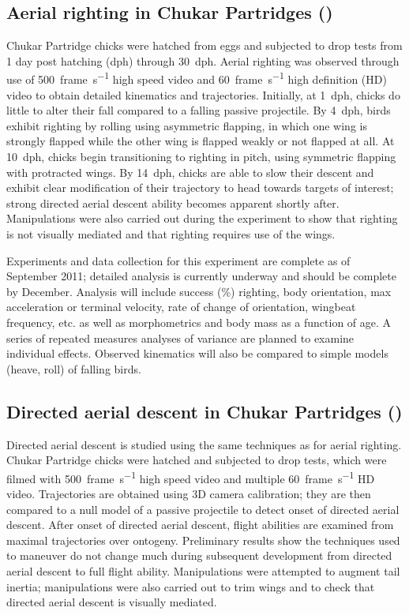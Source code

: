 \subsection{Aerial righting in Chukar Partridges (\Alectorischukar)}
Chukar Partridge chicks were hatched from eggs and subjected to drop tests from 1 day post hatching (dph) through \SI{30}{dph}.  Aerial righting was observed through use of \SI{500}{frame\per\second} high speed video and \SI{60}{frame\per\second} high definition (HD) video to obtain detailed kinematics and trajectories.  Initially, at \SI{1}{dph}, chicks do little to alter their fall compared to a falling passive projectile.  By \SI{4}{dph}, birds exhibit righting by rolling using asymmetric flapping, in which one wing is strongly flapped while the other wing is flapped weakly or not flapped at all.  At \SI{10}{dph}, chicks begin transitioning to righting in pitch, using symmetric flapping with protracted wings.  By \SI{14}{dph}, chicks are able to slow their descent and exhibit clear modification of their trajectory to head towards targets of interest; strong directed aerial descent ability becomes apparent shortly after. Manipulations were also carried out during the experiment to show that righting is not visually mediated and that righting requires use of the wings. 

Experiments and data collection for this experiment are complete as of September 2011; detailed analysis is currently underway and should be complete by December.  Analysis will include success (\%) righting, body orientation, max acceleration or terminal velocity, rate of change of orientation, wingbeat frequency, etc. as well as morphometrics and body mass as a function of age. A series of repeated measures analyses of variance are planned to examine individual effects. Observed kinematics will also be compared to simple models (heave, roll) of falling birds.  

\subsection{Directed aerial descent in Chukar Partridges (\Alectorischukar)}
Directed aerial descent is studied using the same techniques as for aerial righting.  Chukar Partridge chicks were hatched and subjected to drop tests, which were filmed with \SI{500}{frame\per\second} high speed video and multiple \SI{60}{frame\per\second} HD video.  Trajectories are obtained using 3D camera calibration; they are then compared to a null model of a passive projectile to detect onset of directed aerial descent.  After onset of directed aerial descent, flight abilities are examined from maximal trajectories over ontogeny.  Preliminary results show the techniques used to maneuver do not change much during subsequent development from directed aerial descent to full flight ability.  Manipulations were attempted to augment tail inertia; manipulations were also carried out to trim wings and to check that directed aerial descent is visually mediated.


